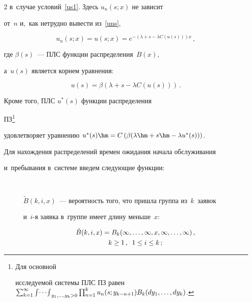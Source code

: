 \begin{multicols}{2}
в~случае условий~\eqref{us1}. Здесь $u_{n}(s;x)$ не зависит


от~$n$ и,~как нетрудно вывести из~\eqref{uns},


$$


u_n(s;x)=u(s;x)=e^{-\left ( \lambda + s - \lambda C(u(s))\right ) x}\,,


$$


где $\beta(s)$~--- ПЛС функции распределения~$B(x)$,


а~$u(s)$ является корнем уравнения:


$$


u(s) = \beta \left (\lambda+s-\lambda C (u(s)) \right )\,.


$$





Кроме того, ПЛС $u^*(s)$ функции распределения


ПЗ\footnote{Для основной


исследуемой системы ПЛС ПЗ равен $\sum\nolimits_{k=1}^\infty


\mathop{\int\!\cdots\!\int}\nolimits_{y_1,\ld,y_{k}>0}


\prod\nolimits_{n=1}^k u_{n}(s;y_{k-n+1})


B_k(dy_1,\dots,dy_k)$.}


удовлетворяет уравнению $u^*(s)\hm=C\left ( \beta(\lambda\hm+s\hm-\lambda u^*(s)) \right)$.





Для нахождения распределений времен ожидания начала обслуживания 


и~пребывания в~системе введем следующие функции:


\begin{description}


\item[\,] ${\tilde B}(k,i,x)$~--- вероятность того, что пришла группа из~$k$~заявок 


и~$i$-я заявка в~группе имеет длину меньше~$x$:


\begin{multline*}


{\tilde B}(k,i,x)=B_k(\infty,\dots,\infty,x,\infty, \dots, \infty)\,,\\ 


k \ge 1\,,\enskip 1 \le i \le k\,;


\end{multline*}






\end{description}
\end{multicols}
